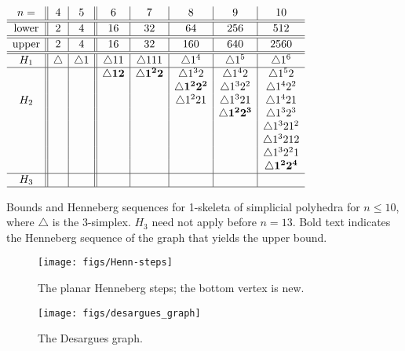 \documentclass[envcountsame]{llncs}
\def\s{{\bigtriangleup}}
\begin{document}
\begin{table}[h]
  \centering  $ \begin{array}{c||c|c||c|c|c|c|c}
      n = & 4 & 5 &6 &7 & 8 & 9  &10\\
      \hline
      \hline
      \mbox{lower}&2&4 & 16 & 32 & 64 & 256 & 512 \\
      \hline
      \hline
      \mbox{upper} &2& 4& 16 & 32 & 160 & 640 & 2560  \\
      \hline
      \hline
      H_1 & \s & \s 1& \s 11& \s111& \s 1^4 &\s 1^5 & \s 1^6\\
      \hline
      &&& \mathbf{\s 12} &\mathbf{ \s1^22} & \s1^32&\s 1^42  &\s1^52\\
      &&&&& \mathbf{\s 1^22^2} & \s 1^3 2^2&\s1^42^2\\
      H_2 &&&&&\s 1^221&\s1^321&\s1^421\\
      &&&&&& \mathbf{\s 1^22^3}&\s1^32^3\\
      &&&&& &&\s1^321^2\\
      &&&&&&&\s1^3212\\
      &&&&&&&\s1^32^21\\
      &&&&&&& \mathbf{\s1^22^4}\\
      \hline
      H_3 &&&&&&&\\
      \hline
    \end{array} $ \medskip
  \caption{Bounds and Henneberg sequences for 1-skeleta of simplicial polyhedra for
$n\le 10$, where $\s$ is the 3-simplex.  $H_3$ need not apply before $n=13$.
Bold text indicates the Henneberg sequence of the graph that yields  the upper bound.}
  \label{tab:3D-constructions}
\end{table} 

\begin{figure}[h]
  \begin{minipage}[b]{0.5\linewidth} \centering
    \texttt{[image: figs/Henn-steps]}
    \caption{The planar Henneberg steps; the bottom vertex is new.}
    \label{planar Henneberg}    
  \end{minipage}
  \hspace{0.1cm} \begin{minipage}[b]{0.5\linewidth}
    \centering
    \texttt{[image: figs/desargues\_graph]}
    \caption{The Desargues graph.}
  \label{desargues graph}    
  \end{minipage}
\end{figure}
\end{document}
